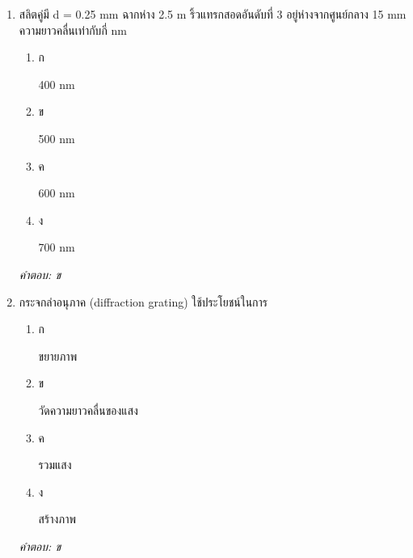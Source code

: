 \documentclass[12pt]{article}
\begin{document}
\begin{enumerate}[label=\arabic*., itemsep=0.5\baselineskip, topsep=0.5\baselineskip, leftmargin=*]
\item สลิตคู่มี d = 0.25 mm ฉากห่าง 2.5 m ริ้วแทรกสอดอันดับที่ 3 อยู่ห่างจากศูนย์กลาง 15 mm ความยาวคลื่นเท่ากับกี่ nm
\begin{enumerate}[label=\alph*)., itemsep=0.3\baselineskip, topsep=0.3\baselineskip]
\item ก\ 
\begin{minipage}[t]{0.9\linewidth}
\raggedright 400 nm
\end{minipage}
\item ข\ 
\begin{minipage}[t]{0.9\linewidth}
\raggedright 500 nm
\end{minipage}
\item ค\ 
\begin{minipage}[t]{0.9\linewidth}
\raggedright 600 nm
\end{minipage}
\item ง\ 
\begin{minipage}[t]{0.9\linewidth}
\raggedright 700 nm
\end{minipage}
\end{enumerate}
\vspace{-0.3\baselineskip}
\begin{small}
\textit{คำตอบ: ข}
\end{small}

\item กระจกลำอนุภาค (diffraction grating) ใช้ประโยชน์ในการ
\begin{enumerate}[label=\alph*)., itemsep=0.3\baselineskip, topsep=0.3\baselineskip]
\item ก\ 
\begin{minipage}[t]{0.9\linewidth}
\raggedright ขยายภาพ
\end{minipage}
\item ข\ 
\begin{minipage}[t]{0.9\linewidth}
\raggedright วัดความยาวคลื่นของแสง
\end{minipage}
\item ค\ 
\begin{minipage}[t]{0.9\linewidth}
\raggedright รวมแสง
\end{minipage}
\item ง\ 
\begin{minipage}[t]{0.9\linewidth}
\raggedright สร้างภาพ
\end{minipage}
\end{enumerate}
\vspace{-0.3\baselineskip}
\begin{small}
\textit{คำตอบ: ข}
\end{small}


\end{enumerate}
\end{document}
